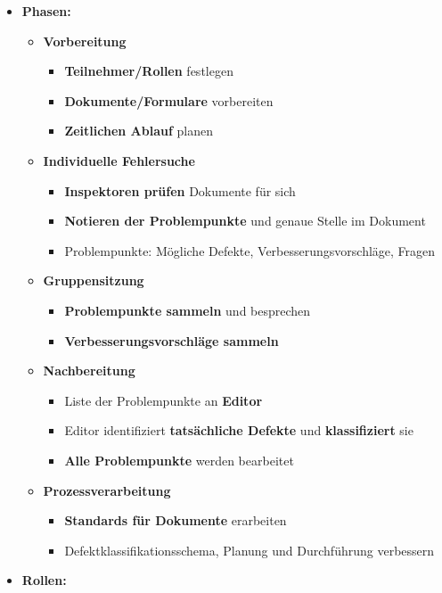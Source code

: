 \documentclass[parskip=full, 12pt]{scrartcl}
\begin{document}
			\begin{itemize}
				\item \textbf{Phasen:}
				\begin{itemize}
					\item \textbf{Vorbereitung}
					\begin{itemize}
						\item \textbf{Teilnehmer/Rollen} festlegen
						\item \textbf{Dokumente/Formulare} vorbereiten
						\item \textbf{Zeitlichen Ablauf} planen
					\end{itemize}
					\item \textbf{Individuelle Fehlersuche}
					\begin{itemize}
						\item \textbf{Inspektoren prüfen} Dokumente für sich
						\item \textbf{Notieren der Problempunkte} und genaue Stelle im Dokument
						\item Problempunkte: Mögliche Defekte, Verbesserungsvorschläge, Fragen
					\end{itemize}
					\item \textbf{Gruppensitzung}
					\begin{itemize}
						\item \textbf{Problempunkte sammeln} und besprechen
						\item \textbf{Verbesserungsvorschläge sammeln}
					\end{itemize}
					\item \textbf{Nachbereitung}
					\begin{itemize}
						\item Liste der Problempunkte an \textbf{Editor}
						\item Editor identifiziert \textbf{tatsächliche Defekte} und \textbf{klassifiziert} sie
						\item \textbf{Alle Problempunkte} werden bearbeitet
					\end{itemize}
					\item \textbf{Prozessverarbeitung}
					\begin{itemize}
						\item \textbf{Standards für Dokumente} erarbeiten
						\item Defektklassifikationsschema, Planung und Durchführung verbessern
					\end{itemize}
				\end{itemize}
				\newpage
				\item \textbf{Rollen:}

\end{itemize}
\end{document}

